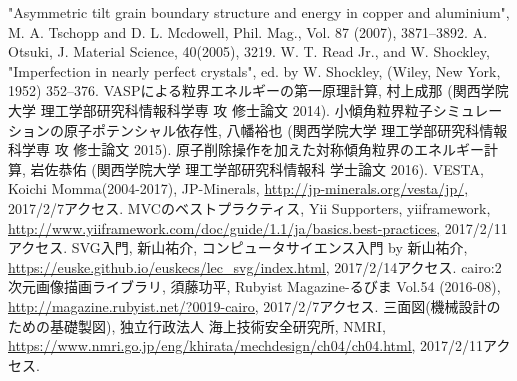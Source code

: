 \begin{thebibliography}{99}
   "Asymmetric tilt grain boundary structure and energy in copper and aluminium", M. A. Tschopp and D. L. Mcdowell, Phil. Mag., Vol. 87 (2007), 3871–3892.
   A. Otsuki, J. Material Science, 40(2005), 3219.
   W. T. Read Jr., and W. Shockley, "Imperfection in nearly perfect crystals", ed. by W. Shockley, (Wiley, New York, 1952) 352--376.
   VASPによる粒界エネルギーの第一原理計算, 村上成那 (関西学院大学 理工学部研究科情報科学専 攻 修士論文 2014).
   小傾角粒界粒子シミュレーションの原子ポテンシャル依存性, 八幡裕也 (関西学院大学 理工学部研究科情報科学専 攻 修士論文 2015).
   原子削除操作を加えた対称傾角粒界のエネルギー計算, 岩佐恭佑 (関西学院大学 理工学部研究科情報科 学士論文 2016).
   VESTA, Koichi Momma(2004-2017), JP-Minerals, \url{http://jp-minerals.org/vesta/jp/,} 2017/2/7アクセス.
   MVCのベストプラクティス, Yii Supporters, yiiframework, \url{http://www.yiiframework.com/doc/guide/1.1/ja/basics.best-practices,} 2017/2/11アクセス.
   SVG入門, 新山祐介, コンピュータサイエンス入門 by 新山祐介, \url{https://euske.github.io/euskecs/lec_svg/index.html,} 2017/2/14アクセス.
   cairo:2次元画像描画ライブラリ, 須藤功平, Rubyist Magazine-るびま Vol.54 (2016-08), \url{http://magazine.rubyist.net/?0019-cairo,} 2017/2/7アクセス.
   三面図(機械設計のための基礎製図), 独立行政法人 海上技術安全研究所, NMRI, \url{https://www.nmri.go.jp/eng/khirata/mechdesign/ch04/ch04.html,} 2017/2/11アクセス.
\end{thebibliography}
